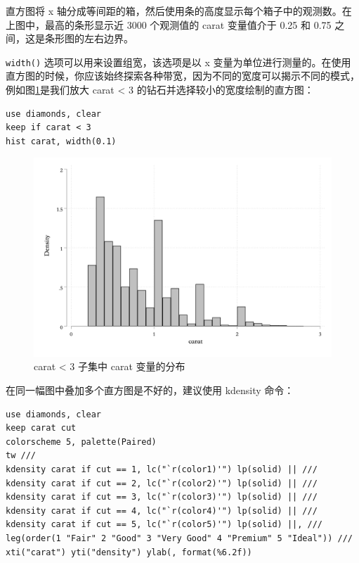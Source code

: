 直方图将 x 轴分成等间距的箱，然后使用条的高度显示每个箱子中的观测数。在上图中，最高的条形显示近 3000 个观测值的 carat 变量值介于 0.25 和 0.75 之间，这是条形图的左右边界。

\texttt{width()} 选项可以用来设置组宽，该选项是以 x 变量为单位进行测量的。在使用直方图的时候，你应该始终探索各种带宽，因为不同的宽度可以揭示不同的模式，例如图\ref{fig:histsmallercarat}是我们放大 carat \textless{} 3 的钻石并选择较小的宽度绘制的直方图：

\begin{lstlisting}
use diamonds, clear
keep if carat < 3
hist carat, width(0.1)
\end{lstlisting}

\begin{figure}[htbp]
  \centering
  \includegraphics[width=\textwidth]{assets/histsmallercarat.png}
  \caption{carat < 3 子集中 carat 变量的分布}
  \label{fig:histsmallercarat}
\end{figure}

在同一幅图中叠加多个直方图是不好的，建议使用 kdensity 命令：

\begin{lstlisting}
use diamonds, clear
keep carat cut
colorscheme 5, palette(Paired)
tw ///
kdensity carat if cut == 1, lc("`r(color1)'") lp(solid) || ///
kdensity carat if cut == 2, lc("`r(color2)'") lp(solid) || ///
kdensity carat if cut == 3, lc("`r(color3)'") lp(solid) || ///
kdensity carat if cut == 4, lc("`r(color4)'") lp(solid) || ///
kdensity carat if cut == 5, lc("`r(color5)'") lp(solid) ||, ///
leg(order(1 "Fair" 2 "Good" 3 "Very Good" 4 "Premium" 5 "Ideal")) ///
xti("carat") yti("density") ylab(, format(%6.2f))
\end{lstlisting}

